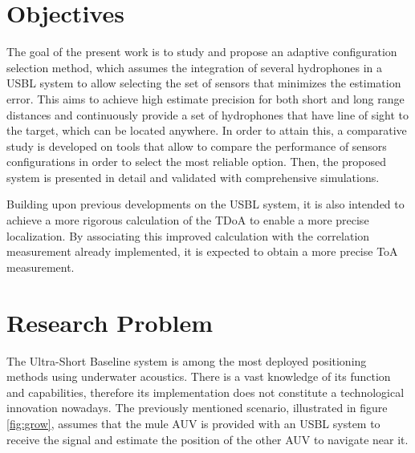 \section{Objectives} \label{sec:objective}

The goal of the present work is to study and propose an adaptive configuration selection method, which assumes the integration of several hydrophones in a USBL system to allow selecting the set of sensors that minimizes the estimation error. This aims to achieve high estimate precision for both short and long range distances and continuously provide a set of hydrophones that have line of sight to the target, which can be located anywhere. In order to attain this, a comparative study is developed on tools that allow to compare the performance of sensors configurations in order to select the most reliable option. Then, the proposed system is presented in detail and validated with comprehensive simulations.

Building upon previous developments on the USBL system, it is also intended to achieve a more rigorous calculation of the TDoA to enable a more precise localization. By associating this improved calculation with the correlation measurement already implemented, it is expected to obtain a more precise ToA measurement. 

\section{Research Problem} \label{sec:res-prob}

The Ultra-Short Baseline system is among the most deployed positioning methods using underwater acoustics. There is a vast knowledge of its function and capabilities, therefore its implementation does not constitute a technological innovation nowadays. The previously mentioned scenario, illustrated in figure \ref{fig:grow}, assumes that the mule AUV is provided with an USBL system to receive the signal and estimate the position of the other AUV to navigate near it.

